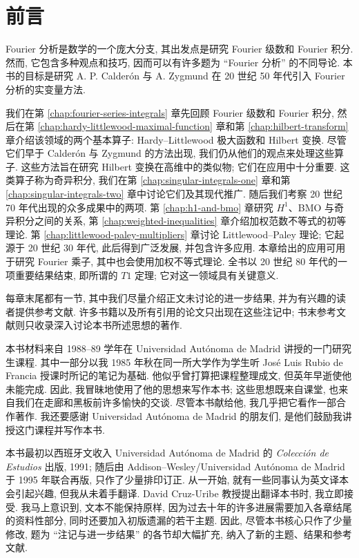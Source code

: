 \thispagestyle{empty}
\hypertarget{frontmatter-page-006}{}
\null
\clearpage

\hypertarget{frontmatter-page-007}{}
\section*{前言}
\label{front:preface}

Fourier 分析是数学的一个庞大分支, 其出发点是研究 Fourier 级数和 Fourier 积分. 然而, 它包含多种观点和技巧, 因而可以有许多题为 ``Fourier 分析'' 的不同导论. 本书的目标是研究 A. P. Calderón 与 A. Zygmund 在 20 世纪 50 年代引入 Fourier 分析的实变量方法.

我们在第 \ref{chap:fourier-series-integrals} 章先回顾 Fourier 级数和 Fourier 积分, 然后在第 \ref{chap:hardy-littlewood-maximal-function} 章和第 \ref{chap:hilbert-transform} 章介绍该领域的两个基本算子: Hardy--Littlewood 极大函数和 Hilbert 变换. 尽管它们早于 Calderón 与 Zygmund 的方法出现, 我们仍从他们的观点来处理这些算子. 这些方法旨在研究 Hilbert 变换在高维中的类似物; 它们在应用中十分重要. 这类算子称为奇异积分, 我们在第 \ref{chap:singular-integrals-one} 章和第 \ref{chap:singular-integrals-two} 章中讨论它们及其现代推广. 随后我们考察 20 世纪 70 年代出现的众多成果中的两项. 第 \ref{chap:h1-and-bmo} 章研究 $H^1$、BMO 与奇异积分之间的关系, 第 \ref{chap:weighted-inequalities} 章介绍加权范数不等式的初等理论. 第 \ref{chap:littlewood-paley-multipliers} 章讨论 Littlewood--Paley 理论; 它起源于 20 世纪 30 年代, 此后得到广泛发展, 并包含许多应用. 本章给出的应用可用于研究 Fourier 乘子, 其中也会使用加权不等式理论. 全书以 20 世纪 80 年代的一项重要结果结束, 即所谓的 $T1$ 定理; 它对这一领域具有关键意义.

每章末尾都有一节, 其中我们尽量介绍正文未讨论的进一步结果, 并为有兴趣的读者提供参考文献. 许多书籍以及所有引用的论文只出现在这些注记中; 书末参考文献则只收录深入讨论本书所述思想的著作.

\clearpage
\hypertarget{frontmatter-page-008}{}

本书材料来自 1988--89 学年在 Universidad Autónoma de Madrid 讲授的一门研究生课程. 其中一部分以我 1985 年秋在同一所大学作为学生听 José Luis Rubio de Francia 授课时所记的笔记为基础. 他似乎曾打算把课程整理成文, 但英年早逝使他未能完成. 因此, 我冒昧地使用了他的思想来写作本书; 这些思想既来自课堂, 也来自我们在走廊和黑板前许多愉快的交谈. 尽管本书献给他, 我几乎把它看作一部合作著作. 我还要感谢 Universidad Autónoma de Madrid 的朋友们, 是他们鼓励我讲授这门课程并写作本书.

本书最初以西班牙文收入 Universidad Autónoma de Madrid 的 \emph{Colección de Estudios} 出版, 1991; 随后由 Addison--Wesley/Universidad Autónoma de Madrid 于 1995 年联合再版, 只作了少量排印订正. 从一开始, 就有一些同事认为英文译本会引起兴趣, 但我从未着手翻译. David Cruz-Uribe 教授提出翻译本书时, 我立即接受. 我马上意识到, 文本不能保持原样, 因为过去十年的许多进展需要加入各章结尾的资料性部分, 同时还要加入初版遗漏的若干主题. 因此, 尽管本书核心只作了少量修改, 题为 ``注记与进一步结果'' 的各节却大幅扩充, 纳入了新的主题、结果和参考文献.

